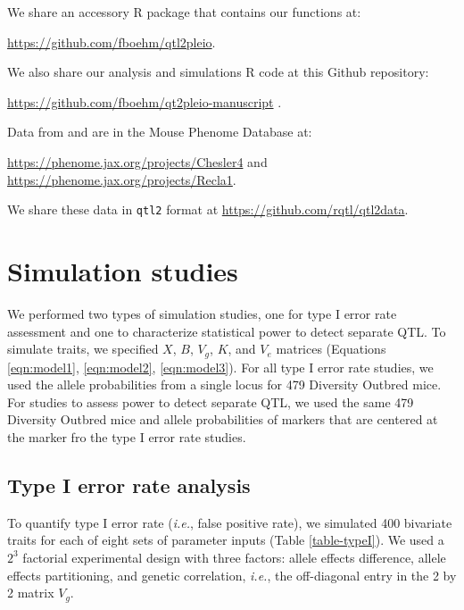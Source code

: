 \documentclass[12pt,twoside, lineno]{gsajnl}
\begin{document}
We share an accessory R package that contains our functions at:

\href{https://github.com/fboehm/qtl2pleio}{https://github.com/fboehm/qtl2pleio}.

\noindent We also share our analysis and simulations R code at this Github repository:

\href{https://github.com/fboehm/qt2pleio-manuscript}{https://github.com/fboehm/qt2pleio-manuscript} \citep{r}.

\noindent Data from \citet{recla2014precise} and \citet{logan2013high} are in the Mouse Phenome Database at:

\href{https://phenome.jax.org/projects/Chesler4}{https://phenome.jax.org/projects/Chesler4} and \href{https://phenome.jax.org/projects/Recla1}{https://phenome.jax.org/projects/Recla1}.

\noindent We share these data in \texttt{qtl2} format at \href{https://github.com/rqtl/qtl2data}{https://github.com/rqtl/qtl2data}.




\section{Simulation studies}

We performed two types of simulation studies, one for type I error rate assessment and one to characterize statistical power to detect separate QTL. To simulate traits, we specified $X$, $B$, $V_g$, $K$, and $V_e$ matrices (Equations \ref{eqn:model1}, \ref{eqn:model2}, \ref{eqn:model3}). For all type I error rate studies, we used the allele probabilities from a single locus for 479 Diversity Outbred mice. For studies to assess power to detect separate QTL, we used the same 479 Diversity Outbred mice and allele probabilities of markers that are centered at the marker fro
the type I error rate studies.

\subsection{Type I error rate analysis}


To quantify type I error rate ({\em i.e.}, false positive rate), we simulated 400 bivariate traits for each of eight sets of parameter inputs (Table \ref{table-typeI}). We used a $2^3$ factorial experimental design with three factors: allele effects difference, allele effects partitioning, and genetic correlation, \textit{i.e.}, the off-diagonal entry in the 2 by 2 matrix $V_g$.
\end{document}
